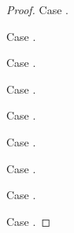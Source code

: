\documentclass[acmsmall,screen,review,anonymous,nonacm]{acmart}
\begin{document}
\begin{proof}
  Case .

  Case .

  Case .

  Case .

  Case .

  Case .

  Case .

  Case .

  Case .
\end{proof}


\clearpage

\clearpage

\clearpage

\end{document}
